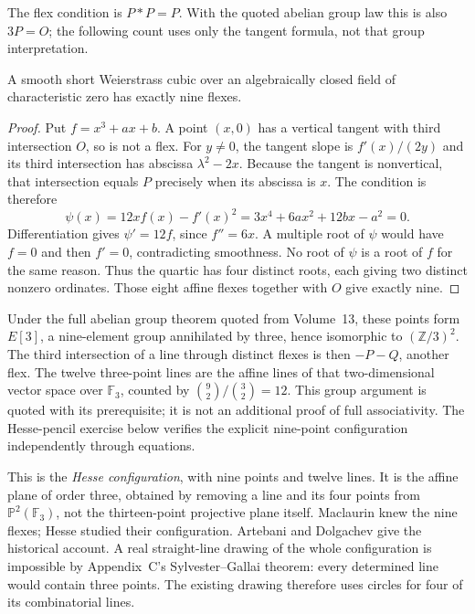 The flex condition is $P*P=P$. With the quoted abelian group law this is also $3P=O$; the following count uses only the tangent formula, not that group interpretation.

\begin{theorem}\label{geometry:thm:nineflexes}
A smooth short Weierstrass cubic over an algebraically closed field of characteristic zero has exactly nine flexes.
\end{theorem}
\begin{proof}
Put $f=x^3+ax+b$. A point $(x,0)$ has a vertical tangent with third intersection $O$, so is not a flex. For $y\ne0$, the tangent slope is $f'(x)/(2y)$ and its third intersection has abscissa $\lambda^2-2x$. Because the tangent is nonvertical, that intersection equals $P$ precisely when its abscissa is $x$. The condition is therefore
\[
\psi(x)=12xf(x)-f'(x)^2
=3x^4+6ax^2+12bx-a^2=0.
\]
Differentiation gives $\psi'=12f$, since $f''=6x$. A multiple root of $\psi$ would have $f=0$ and then $f'=0$, contradicting smoothness. No root of $\psi$ is a root of $f$ for the same reason. Thus the quartic has four distinct roots, each giving two distinct nonzero ordinates. Those eight affine flexes together with $O$ give exactly nine.
\end{proof}

\begin{remark}
Under the full abelian group theorem quoted from Volume~13, these points form $E[3]$, a nine-element group annihilated by three, hence isomorphic to $(\mathbb Z/3)^2$. The third intersection of a line through distinct flexes is then $-P-Q$, another flex. The twelve three-point lines are the affine lines of that two-dimensional vector space over $\mathbb F_3$, counted by $\binom92/\binom32=12$. This group argument is quoted with its prerequisite; it is not an additional proof of full associativity. The Hesse-pencil exercise below verifies the explicit nine-point configuration independently through equations.
\end{remark}

This is the \emph{Hesse configuration}, with nine points and twelve lines. It is the affine plane of order three, obtained by removing a line and its four points from $\mathbb P^2(\mathbb F_3)$, not the thirteen-point projective plane itself. Maclaurin knew the nine flexes; Hesse studied their configuration. Artebani and Dolgachev give the historical account. A real straight-line drawing of the whole configuration is impossible by Appendix~C's Sylvester--Gallai theorem: every determined line would contain three points. The existing drawing therefore uses circles for four of its combinatorial lines.

